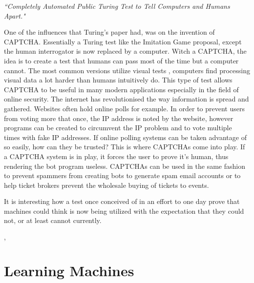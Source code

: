\documentclass{scrartcl}
\begin{document}
\textit{\textquotedblleft Completely Automated Public Turing Test to Tell Computers and Humans Apart."} \par
One of the influences that Turing's paper had, was on the invention of CAPTCHA. Essentially a Turing test like the Imitation Game proposal, except the human interrogator is now replaced by a computer\cite{von2004telling}. Witch a CAPTCHA, the idea is to create a test that humans can pass most of the time but a computer cannot. The most common versions utilize visual tests \cite{fischer2006visual}, computers find processing visual data a lot harder than humans intuitively do. This type of test allows CAPTCHA to be useful in many modern applications especially in the field of online security. The internet has revolutionised the way information is spread and gathered. Websites often hold online polls for example. In order to prevent users from voting more that once, the IP address is noted by the website, however programs can be created to circumvent the IP problem and to vote multiple times with fake IP addresses. If online polling systems can be taken advantage of so easily, how can they be trusted?  This is where CAPTCHAs come into play. If a CAPTCHA system is in play, it forces the user to prove it's human, thus rendering the bot program useless. CAPTCHAs can be used in the same fashion to prevent spammers from creating bots to generate spam email accounts or to help ticket brokers prevent the wholesale buying of tickets to events.\par
It is interesting how a test once conceived of in an effort to one day prove that machines could think is now being utilized with the expectation that they could not, or at least cannot currently. 

\cite{mori2003recognizing}, 


\section{Learning Machines}
\end{document}

